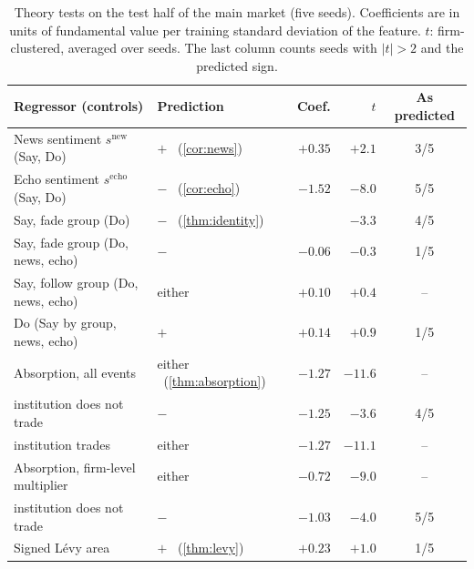 \documentclass[11pt,a4paper]{article}
\theoremstyle{plain}
\theoremstyle{definition}
\theoremstyle{remark}
\begin{document}
\begin{table}[ht]
\centering
\caption{Theory tests on the test half of the main market (five seeds). Coefficients are in units of fundamental value per training standard deviation of the feature. $t$: firm-clustered, averaged over seeds. The last column counts seeds with $|t|>2$ and the predicted sign.}
\label{tab:tests}
\small
\begin{tabularx}{\textwidth}{@{}>{\raggedright\arraybackslash}Xlrrc@{}}
\toprule
Regressor (controls) & Prediction & Coef. & $t$ & As predicted \\
\midrule
News sentiment $s^{\text{new}}$ (Say, Do) & $+$ \ (\cref{cor:news}) & $+0.35$ & $+2.1$ & 3/5 \\
Echo sentiment $s^{\text{echo}}$ (Say, Do) & $-$ \ (\cref{cor:echo}) & $-1.52$ & $-8.0$ & 5/5 \\
\addlinespace
Say, fade group (Do) & $-$ \ (\cref{thm:identity}) & & $-3.3$ & 4/5 \\
Say, fade group (Do, news, echo) & $-$ & $-0.06$ & $-0.3$ & 1/5 \\
Say, follow group (Do, news, echo) & either & $+0.10$ & $+0.4$ & -- \\
Do (Say by group, news, echo) & $+$ & $+0.14$ & $+0.9$ & 1/5 \\
\addlinespace
Absorption, all events & either \ (\cref{thm:absorption}) & $-1.27$ & $-11.6$ & -- \\
\quad institution does not trade & $-$ & $-1.25$ & $-3.6$ & 4/5 \\
\quad institution trades & either & $-1.27$ & $-11.1$ & -- \\
Absorption, firm-level multiplier & either & $-0.72$ & $-9.0$ & -- \\
\quad institution does not trade & $-$ & $-1.03$ & $-4.0$ & 5/5 \\
\addlinespace
Signed L\'evy area & $+$ \ (\cref{thm:levy}) & $+0.23$ & $+1.0$ & 1/5 \\
\bottomrule
\end{tabularx}
\end{table}
\end{document}
